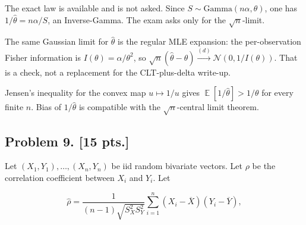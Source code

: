 \documentclass[11pt,a4paper]{article}
\DeclareMathOperator{\E}{\mathbb{E}}
\begin{document}
\begin{remark}
\label{rem:p8b-exact}
The exact law is available and is not asked. Since \( S\sim\mathrm{Gamma}(n\alpha,\theta) \), one has \( 1/\hat{\theta}=n\alpha/S \), an Inverse-Gamma. The exam asks only for the \( \sqrt{n} \)-limit.

The same Gaussian limit for \( \hat{\theta} \) is the regular MLE expansion: the per-observation Fisher information is \( I(\theta)=\alpha/\theta^{2} \), so \( \sqrt{n}(\hat{\theta}-\theta)\xrightarrow{(d)}\mathcal{N}(0,1/I(\theta)) \). That is a check, not a replacement for the CLT-plus-delta write-up.

Jensen's inequality for the convex map \( u\mapsto 1/u \) gives \( \E[1/\hat{\theta}]>1/\theta \) for every finite \( n \). Bias of \( 1/\hat{\theta} \) is compatible with the \( \sqrt{n} \)-central limit theorem.
\end{remark}

\subsection{Problem 9. [15 pts.]}
Let \( (X_1, Y_1), \dots, (X_n, Y_n) \) be iid random bivariate vectors. Let \( \rho \) be the correlation coefficient between \( X_i \) and \( Y_i \). Let

\[
\hat{\rho} = \frac{1}{(n-1)\sqrt{S_X^2 S_Y^2}} \sum_{i=1}^n (X_i - \overline{X})(Y_i - \overline{Y}),
\]
\end{document}
